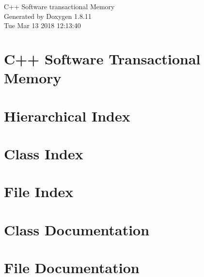 \documentclass[twoside]{article}
\newcommand{\+}{\discretionary{\mbox{\scriptsize$\hookleftarrow$}}{}{}}
\newcommand{\clearemptydoublepage}{%
  \newpage{\pagestyle{empty}\cleardoublepage}%
}
\begin{document}
\hypersetup{pageanchor=false,
             bookmarksnumbered=true,
             pdfencoding=unicode
            }
\begin{titlepage}
\vspace*{7cm}
\begin{center}%
{\Large C++ Software transactional Memory }\\
\vspace*{1cm}
{\large Generated by Doxygen 1.8.11}\\
\vspace*{0.5cm}
{\small Tue Mar 13 2018 12:13:40}\\
\end{center}
\end{titlepage}
\tableofcontents
{}
\hypersetup{pageanchor=true}

\newpage
\section{C++ Software Transactional Memory}
\label{index}\hypertarget{index}{}
\newpage
\section{Hierarchical Index}

\section{Class Index}

\section{File Index}

\section{Class Documentation}






\section{File Documentation}




























\newpage
{}
\clearemptydoublepage
{}
\printindex
\end{document}
